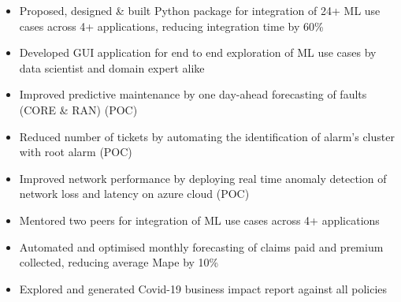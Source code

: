 \documentclass[10pt,a4paper,ragged2e,withhyper]{altacv}
\author{Madhusudan Kumar}
\date{\today}
\title{}
\begin{document}

\makecvheader

\begin{paracol}{2}
\label{sec:org88b6b29}
\begin{itemize}
\item Proposed, designed \& built Python package for integration of 24+ ML use cases across 4+ applications, reducing integration time by 60\%
\item Developed GUI application for end to end exploration of ML use cases by data scientist and domain expert alike
\item Improved predictive maintenance by one day-ahead forecasting of faults (CORE \& RAN) (POC)
\item Reduced number of tickets by automating the identification of alarm’s cluster with root alarm (POC)
\item Improved network performance by deploying real time anomaly detection of network loss and latency on azure cloud (POC)
\item Mentored two peers for integration of ML use cases across 4+ applications
\end{itemize}

\par\divider
{}
\begin{itemize}
\item Automated and optimised monthly forecasting of claims paid and premium collected, reducing average Mape by 10\%
\item Explored and generated Covid-19 business impact report against all policies
\end{itemize}

\par\divider



\end{paracol}
\end{document}
